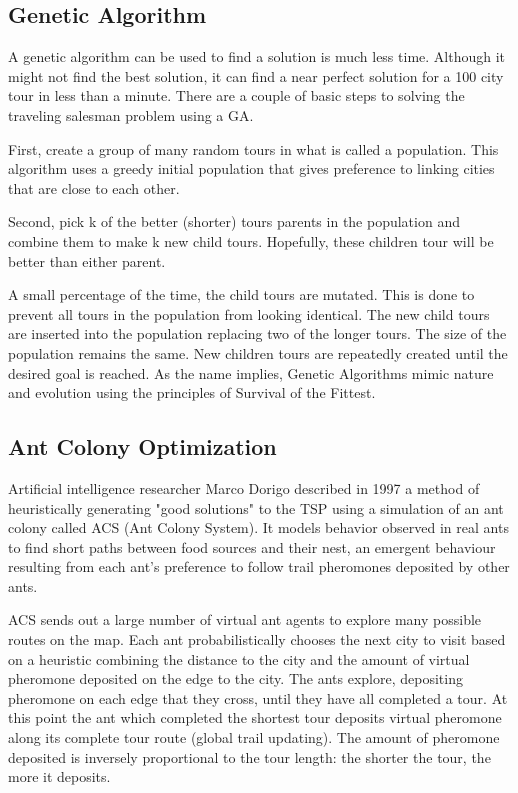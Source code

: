 \subsection{Genetic Algorithm}

A genetic algorithm can be used to find a solution is much less time. Although it might not find the best solution, it can find a near perfect solution for a 100 city tour in less than a minute. There are a couple of basic steps to solving the traveling salesman problem using a GA.

First, create a group of many random tours in what is called a population. This algorithm uses a greedy initial population that gives preference to linking cities that are close to each other. 

Second, pick k of the better (shorter) tours parents in the population and combine them to make k new child tours. Hopefully, these children tour will be better than either parent.

A small percentage of the time, the child tours are mutated. This is done to prevent all tours in the population from looking identical. The new child tours are inserted into the population replacing two of the longer tours. The size of the population remains the same. 
New children tours are repeatedly created until the desired goal is reached.
As the name implies, Genetic Algorithms mimic nature and evolution using the principles of Survival of the Fittest. 

\subsection{Ant Colony Optimization}

Artificial intelligence researcher Marco Dorigo described in 1997 a method of heuristically generating "good solutions" to the TSP using a simulation of an ant colony called ACS (Ant Colony System). It models behavior observed in real ants to find short paths between food sources and their nest, an emergent behaviour resulting from each ant's preference to follow trail pheromones deposited by other ants.

ACS sends out a large number of virtual ant agents to explore many possible routes on the map. Each ant probabilistically chooses the next city to visit based on a heuristic combining the distance to the city and the amount of virtual pheromone deposited on the edge to the city. The ants explore, depositing pheromone on each edge that they cross, until they have all completed a tour. At this point the ant which completed the shortest tour deposits virtual pheromone along its complete tour route (global trail updating). The amount of pheromone deposited is inversely proportional to the tour length: the shorter the tour, the more it deposits.

